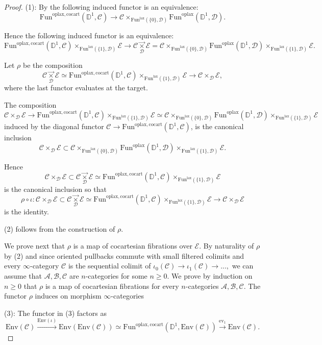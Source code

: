 \documentclass[10pt,oneside]{article}
\numberwithin{equation}{section} %
\numberwithin{figure}{section} %
\theoremstyle{plain}
\theoremstyle{definition}
\newcommand{\bD}{{\mathbb D}}
\newcommand{\mA}{{\mathcal A}}
\newcommand{\mB}{{\mathcal B}}
\newcommand{\mC}{{\mathcal C}}
\newcommand{\mD}{{\mathcal D}}
\newcommand{\mE}{{\mathcal E}}
\newcommand{\Env}{{\mathrm{Env}}}
\newcommand{\Fun}{\mathrm{Fun}}
\newcommand{\cocart}{{\mathrm{cocart}}}
\newcommand{\lax}{{\mathrm{lax}}}
\newcommand{\oplax}{{\mathrm{oplax}}}
\newcommand{\ev}{{\mathrm{ev}}}
\begin{document}
\begin{proof}

(1): By  the following induced functor is an equivalence: $$\Fun^{\oplax, \cocart}(\bD^1,\mC) \to \mC \times_{\Fun^\lax(\{0\},\mD)} \Fun^\oplax(\bD^1,\mD). $$ 

Hence the following induced functor is an equivalence: $$\Fun^{\oplax, \cocart}(\bD^1,\mC) \times_{\Fun^\lax(\{1\},\mD)} \mE \to \mC \underset{\mD}{\vec{\times}} \mE = \mC \times_{\Fun^\lax(\{0\},\mD)} \Fun^\oplax(\bD^1,\mD) \times_{\Fun^\lax(\{1\},\mD)} \mE.$$

Let $\rho$ be the composition
$$ \mC \underset{\mD}{\vec{\times}} \mE \simeq \Fun^{\oplax, \cocart}(\bD^1,\mC) \times_{\Fun^\lax(\{1\},\mD)} \mE \to \mC \times_{\mD} \mE, $$
where the last functor evaluates at the target.

The composition $$\mC \times_{\mD} \mE \to \Fun^{\oplax, \cocart}(\bD^1,\mC) \times_{\Fun^\lax(\{1\},\mD)} \mE \simeq \mC \times_{\Fun^\lax(\{0\},\mD)} \Fun^\oplax(\bD^1,\mD) \times_{\Fun^\lax(\{1\},\mD)} \mE $$
induced by the diagonal functor $\mC \to \Fun^{\oplax, \cocart}(\bD^1,\mC)$, is the canonical inclusion
$$\mC \times_{\mD} \mE \subset \mC \times_{\Fun^\lax(\{0\},\mD)} \Fun^\oplax(\bD^1,\mD) \times_{\Fun^\lax(\{1\},\mD)} \mE.$$

Hence $$\mC \times_{\mD} \mE \subset \mC \underset{\mD}{\vec{\times}} \mE \simeq \Fun^{\oplax, \cocart}(\bD^1,\mC) \times_{\Fun^\lax(\{1\},\mD)} \mE $$ 
is the canonical inclusion so that
$$\rho \circ \iota: \mC \times_{\mD} \mE \subset \mC \underset{\mD}{\vec{\times}} \mE \simeq \Fun^{\oplax, \cocart}(\bD^1,\mC) \times_{\Fun^\lax(\{1\},\mD)} \mE \to \mC \times_{\mD} \mE $$ 
is the identity.


(2) follows from the construction of $\rho.$

We prove next that $\rho$ is a map of cocartesian fibrations over $\mE.$
By naturality of $\rho$ by (2) and since oriented pullbacks commute with small filtered colimits and every $\infty$-category $\mC$
is the sequential colimit of $\iota_0(\mC) \to \iota_1(\mC) \to ...,$
we can assume that $\mA,\mB,\mC$ are $n$-categories for some $n \geq 0.$
We prove by induction on $n \geq 0$ that $\rho$ is a map of cocartesian fibrations for every $n$-categories $\mA,\mB,\mC.$
The functor $\rho$ induces on morphism $\infty$-categories 

(3): The functor in (3) factors as 
$$ \Env(\mC) \xrightarrow{\Env(\iota)} \Env(\Env(\mC)) \simeq \Fun^{\oplax, \cocart}(\bD^1,\Env(\mC)) \xrightarrow{\ev_1} \Env(\mC). $$


\end{proof}
\end{document}
